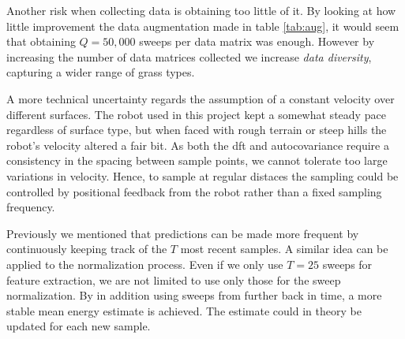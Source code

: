 Another risk when collecting data is obtaining too little of it. By looking at how little improvement the data augmentation made in table \ref{tab:aug}, it would seem that obtaining $Q=50,000$ sweeps per data matrix was enough. However by increasing the number of data matrices collected we increase \emph{data diversity}, capturing a wider range of grass types. 

A more technical uncertainty regards the assumption of a constant velocity over different surfaces. The robot used in this project kept a somewhat steady pace regardless of surface type, but when faced with rough terrain or steep hills the robot's velocity altered a fair bit. As both the \gls{dft} and autocovariance require a consistency in the spacing between sample points, we cannot tolerate too large variations in velocity. Hence, to sample at regular distaces the sampling could be controlled by positional feedback from the robot rather than a fixed sampling frequency.

Previously we mentioned that predictions can be made more frequent by continuously keeping track of the $T$ most recent samples. A similar idea can be applied to the normalization process. Even if we only use $T=25$ sweeps for feature extraction, we are not limited to use only those for the sweep normalization. By in addition using sweeps from further back in time, a more stable mean energy estimate is achieved. The estimate could in theory be updated for each new sample.






